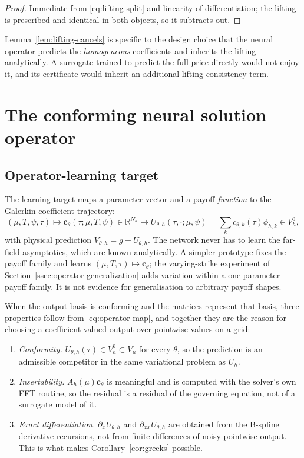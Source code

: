 \documentclass[11pt]{amsart}
\theoremstyle{remark}
\newcommand{\R}{\mathbb{R}}
\newcommand{\Vh}{V_h^0}
\newcommand{\Vmu}{V_{\mu}}
\newcommand{\Ah}{A_h}
\newcommand{\cc}{\mathbf c}
\begin{document}
\begin{proof}
Immediate from \eqref{eq:lifting-split} and linearity of differentiation; the
lifting is prescribed and identical in both objects, so it subtracts out.
\end{proof}

Lemma~\ref{lem:lifting-cancels} is specific to the design choice that the
neural operator predicts the \emph{homogeneous} coefficients and inherits the
lifting analytically.  A surrogate trained to predict the full price directly
would not enjoy it, and its certificate would inherit an additional lifting
consistency term.

\section{The conforming neural solution operator}
\label{sec:operator}

\subsection{Operator-learning target}
\label{ssec:target}

The learning target maps a parameter vector and a payoff \emph{function} to
the Galerkin coefficient trajectory:
\begin{equation}
 \boxed{
 (\mu,T,\psi,\tau)
 \longmapsto
 \cc_\theta(\tau;\mu,T,\psi)\in\R^{N_h}
 \longmapsto
 U_{\theta,h}(\tau,\cdot;\mu,\psi)=\sum_{k}c_{\theta,k}(\tau)\phi_{h,k}\in\Vh,}
 \label{eq:operator-map}
\end{equation}
with physical prediction $V_{\theta,h}=g+U_{\theta,h}$.  The network never has
to learn the far-field asymptotics, which are known analytically.  A simpler
prototype fixes the payoff family and learns $(\mu,T,\tau)\mapsto\cc_\theta$;
the varying-strike experiment of Section~\ref{ssec:operator-generalization}
adds variation within a one-parameter payoff family. It is not evidence
for generalisation to arbitrary payoff shapes.

When the output basis is conforming and the matrices represent that basis,
three properties follow from \eqref{eq:operator-map}, and together
they are the reason for choosing a coefficient-valued output over pointwise
values on a grid:
\begin{enumerate}[leftmargin=2em]
\item \emph{Conformity.}  $U_{\theta,h}(\tau)\in\Vh\subset\Vmu$ for every
$\theta$, so the prediction is an admissible competitor in the same
variational problem as $U_h$.
\item \emph{Insertability.}  $\Ah(\mu)\cc_\theta$ is meaningful and is
computed with the solver's own FFT routine, so the residual is a residual of
the governing equation, not of a surrogate model of it.
\item \emph{Exact differentiation.}  $\partial_xU_{\theta,h}$ and
$\partial_{xx}U_{\theta,h}$ are obtained from the B-spline derivative
recursions, not from finite differences of noisy pointwise output.  This is
what makes Corollary~\ref{cor:greeks} possible.
\end{enumerate}
\end{document}
